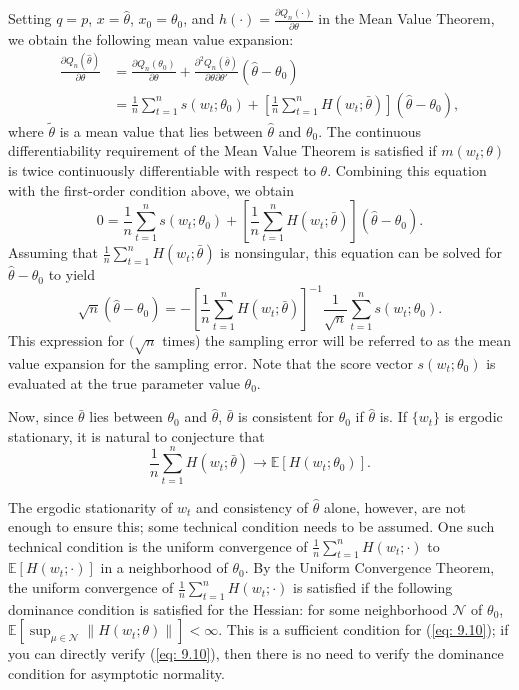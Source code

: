 Setting $q = p$, $x = \hat{\theta}$, $x_0 = \theta_0$, and $h(\cdot) = \frac{\partial Q_n(\cdot)}{\partial \theta}$ in the Mean Value Theorem, 
we obtain the following mean value expansion:
\begin{align}
    \frac{\partial Q_n(\hat{\theta})}{\partial \theta} &= \frac{\partial Q_n(\theta_0)}{\partial \theta} + \frac{\partial^2 Q_n(\bar{\theta})}{\partial \theta \partial \theta'} (\hat{\theta} - \theta_0) \\
    &= \frac{1}{n} \sum_{t=1}^n s(w_t; \theta_0) + \left[\frac{1}{n} \sum_{t=1}^n H(w_t; \bar{\theta}) \right] (\hat{\theta} - \theta_0),
\end{align}
where $\tilde{\theta}$ is a mean value that lies between $\hat{\theta}$ and $\theta_0$. 
The continuous differentiability requirement of the Mean Value Theorem is satisfied if $m(w_t; \theta)$ is twice continuously differentiable with respect to $\theta$. 
Combining this equation with the first-order condition above, we obtain
\begin{equation}
    0 = \frac{1}{n} \sum_{t=1}^n s(w_t; \theta_0) + \left[\frac{1}{n} \sum_{t=1}^n H(w_t; \bar{\theta}) \right] (\hat{\theta} - \theta_0).
\end{equation}
Assuming that $\frac{1}{n} \sum_{t=1}^n H(w_t; \bar{\theta})$ is nonsingular, this equation can be solved for $\hat{\theta} - \theta_0$ to yield
\begin{equation}
    \sqrt{n}(\hat{\theta} - \theta_0) = -\left[\frac{1}{n} \sum_{t=1}^n H(w_t; \bar{\theta})\right]^{-1} \frac{1}{\sqrt{n}} \sum_{t=1}^n s(w_t; \theta_0).
\end{equation}
This expression for $(\sqrt{n}$ times) the sampling error will be referred to as the mean value expansion for the sampling error. 
Note that the score vector $s(w_t; \theta_0)$ is evaluated at the true parameter value $\theta_0$.

Now, since $\bar{\theta}$ lies between $\theta_0$ and $\hat{\theta}$, $\bar{\theta}$ is consistent for $\theta_0$ if $\hat{\theta}$ is. If $\{w_t\}$ is ergodic stationary, 
it is natural to conjecture that
\begin{equation}\label{eq: 9.10}
    \frac{1}{n} \sum_{t=1}^n H(w_t; \bar{\theta}) \rightarrow \mathbb{E}[H(w_t; \theta_0)].
\end{equation}

The ergodic stationarity of $w_t$ and consistency of $\hat{\theta}$ alone, however, 
are not enough to ensure this; some technical condition needs to be assumed. 
One such technical condition is the uniform convergence of $\frac{1}{n} \sum_{t=1}^n H(w_t; \cdot)$ to $\mathbb{E}[H(w_t; \cdot)]$ in a neighborhood of $\theta_0$. 
By the Uniform Convergence Theorem, the uniform convergence of $\frac{1}{n} \sum_{t=1}^n H(w_t; \cdot)$ is satisfied if the following dominance condition is satisfied for the Hessian: 
for some neighborhood $\mathcal{N}$ of $\theta_0$, $\mathbb{E} \left[ \sup_{\mu \in \mathcal{N}} \| H(w_t; \theta) \| \right] < \infty$. This is a sufficient condition for (\ref{eq: 9.10}); 
if you can directly verify (\ref{eq: 9.10}), then there is no need to verify the dominance condition for asymptotic normality.

